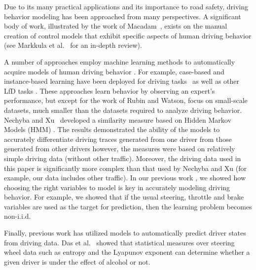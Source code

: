 \documentclass[draft,dvipsnames]{drexel-thesis}
\begin{document}
\begin{thesis}
Due to its many practical applications and its importance to road safety, driving behavior modeling has been approached from many perspectives. A significant body of work, illustrated by the work of Macadam~\cite{macadam2003understanding}, exists on the manual creation of control models that exhibit specific aspects of human driving behavior (see Markkula et al.~\cite{markkula2012review} for an in-depth review).

A number of approaches employ machine learning methods to automatically acquire models of human driving behavior \cite{fernlund2006lfo,Pomerleau_1989_2055}. For example, case-based and instance-based learning have been deployed for driving tasks~\cite{ontanon2014case} as well as other LfD tasks \cite{floyd2008imitating,ontanon2010darmok,DBLP:conf/ijcai/RubinW11,lamontagne2012acquisition}. These approaches learn behavior by observing an expert's performance, but except for the work of Rubin and Watson, focus on small-scale datasets, much smaller than the datasets required to analyze driving behavior. Nechyba and Xu~\cite{nechyba1998stochastic} developed a similarity measure based on Hidden Markov Models (HMM) \cite{rabiner1986introduction}. The results demonstrated the ability of the models to accurately differentiate driving traces generated from one driver from those generated from other drivers however, the measures were based on relatively simple driving data (without other traffic). Moreover, the driving data used in this paper is significantly more complex than that used by Nechyba and Xu (for example, our data includes other traffic). In our previous work \cite{lee2017learning}, we showed how choosing the right variables to model is key in accurately modeling driving behavior. For example, we showed that if the usual steering, throttle and brake variables are used as the target for prediction, then the learning problem becomes non-i.i.d.

Finally, previous work has utilized models to automatically predict driver states from driving data. Das et al.~\cite{das2012differentiating} showed that statistical measures over steering wheel data such as entropy and the Lyapunov exponent can determine whether a given driver is under the effect of alcohol or not. 

%
%


\end{thesis}
\end{document}
